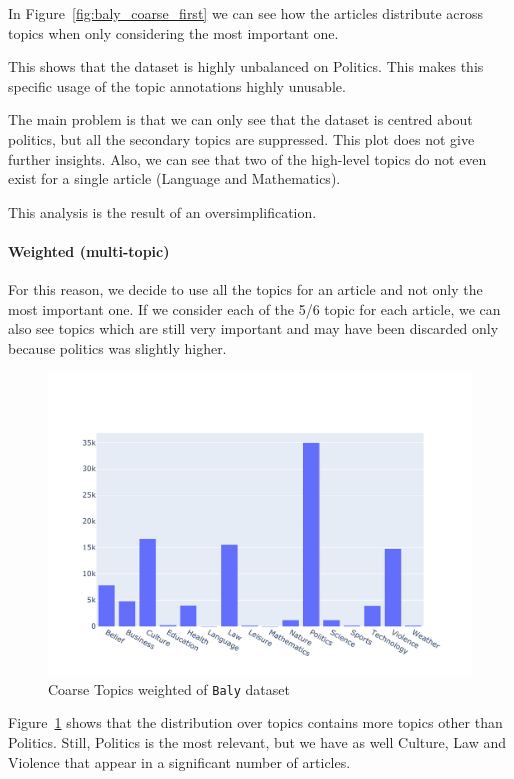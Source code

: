In Figure~\ref{fig:baly_coarse_first} we can see how the articles distribute across topics when only considering the most important one.

This shows that the dataset is highly unbalanced on Politics. This makes this specific usage of the topic annotations highly unusable.

The main problem is that we can only see that the dataset is centred about politics, but all the secondary topics are suppressed.
This plot does not give further insights.
Also, we can see that two of the high-level topics do not even exist for a single article (Language and Mathematics).

This analysis is the result of an oversimplification.

\paragraph{Weighted (multi-topic)}

For this reason, we decide to use all the topics for an article and not only the most important one.
If we consider each of the 5/6 topic for each article, we can also see topics which are still very important and may have been discarded only because politics was slightly higher.

\begin{figure}[!htbp]
    \centering
    \includegraphics[width=\linewidth]{figures/baly_coarse_weighted.pdf}
    \caption{Coarse Topics weighted of \texttt{Baly} dataset}
    \label{fig:baly_coarse_weighted}
\end{figure}

Figure~\ref{fig:baly_coarse_weighted} shows that the distribution over topics contains more topics other than Politics.
Still, Politics is the most relevant, but we have as well Culture, Law and Violence that appear in a significant number of articles.


